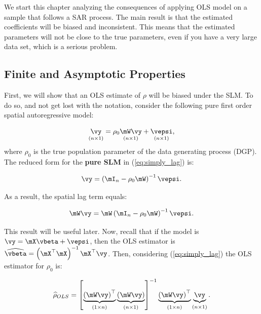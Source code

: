 We start this chapter analyzing the consequences of applying OLS model on a sample that follows a SAR process. The main result is that the estimated coefficients will be biased and inconsistent. This means that the estimated parameters will not be close to the true parameters, even if you have a very large data set, which is a serious problem.

\subsection{Finite and Asymptotic Properties}

First, we will show that an OLS estimate of $\rho$ will be biased under the SLM. To do so, and not get lost with the notation, consider the following pure first order spatial autoregressive model:

\begin{equation}\label{eq:simply_lag}
\underset{(n\times 1)}{\vy} = \rho_0\underset{(n\times 1)}{\mW\vy} + \underset{(n\times 1)}{\vepsi},
\end{equation}
%
where $\rho_0$ is the true population parameter of the data generating process (DGP). The reduced form for the \textbf{pure SLM} in (\ref{eq:simply_lag}) is:

\begin{equation}\label{eq:reduced_form_pure_slm}
\vy =\left(\mI_n - \rho_0\mW\right)^{-1}\vepsi.
\end{equation}

As a result, the spatial lag term equals:

\begin{equation}\label{eq:wy_pure}
  \mW\vy = \mW\left(\mI_n - \rho_0\mW\right)^{-1}\vepsi.
\end{equation}

This result will be useful later. Now, recall that if the model is $\vy = \mX\vbeta + \vepsi$, then the OLS estimator is $\widehat{\vbeta} = \left(\mX^\top\mX\right)^{-1}\mX^\top\vy$. Then, considering (\ref{eq:simply_lag}) the OLS estimator for $\rho_0$ is: 

\begin{equation}\label{eq:rho_ols}
\widehat{\rho}_{OLS} = \left[\underbrace{\left(\mW\vy \right)^\top}_{(1\times n)}\underbrace{\left(\mW\vy \right)}_{(n\times 1)}\right]^{-1}\underbrace{\left(\mW\vy \right)^\top}_{(1\times n)}\underbrace{\vy}_{(n\times 1)}.
\end{equation}

